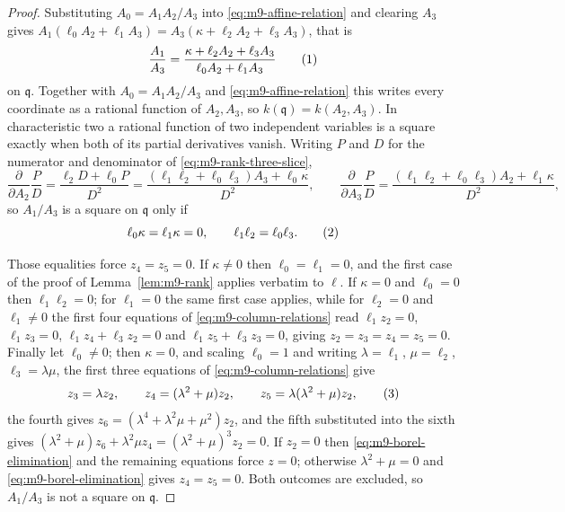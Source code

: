 \begin{proof}
Substituting $A_0=A_1A_2/A_3$ into \eqref{eq:m9-affine-relation} and clearing
$A_3$ gives $A_1(\ell_0A_2+\ell_1A_3)=A_3(\kappa+\ell_2A_2+\ell_3A_3)$, that
is
\[
 \frac{A_1}{A_3}=\frac{\kappa+\ell_2A_2+\ell_3A_3}
                      {\ell_0A_2+\ell_1A_3}
 \autoeqtag{eq:m9-rank-three-slice}
\]
on $\mathfrak q$.  Together with $A_0=A_1A_2/A_3$ and
\eqref{eq:m9-affine-relation} this writes every coordinate as a rational
function of $A_2,A_3$, so $k(\mathfrak q)=k(A_2,A_3)$.  In characteristic two
a rational function of
two independent variables is a square exactly when both of its partial
derivatives vanish.  Writing $P$ and $D$ for the numerator and denominator of
\eqref{eq:m9-rank-three-slice},
\[
 \frac{\partial}{\partial A_2}\frac PD=\frac{\ell_2D+\ell_0P}{D^2}
 =\frac{(\ell_1\ell_2+\ell_0\ell_3)A_3+\ell_0\kappa}{D^2},
 \qquad
 \frac{\partial}{\partial A_3}\frac PD
 =\frac{(\ell_1\ell_2+\ell_0\ell_3)A_2+\ell_1\kappa}{D^2},
\]
so $A_1/A_3$ is a square on $\mathfrak q$ only if
\[
 \ell_0\kappa=\ell_1\kappa=0,\qquad \ell_1\ell_2=\ell_0\ell_3 .
 \autoeqtag{eq:m9-square-obstruction}
\]

Those equalities force $z_4=z_5=0$.  If $\kappa\neq0$ then
$\ell_0=\ell_1=0$, and the first case of the proof of
Lemma~\ref{lem:m9-rank} applies verbatim to $\ell$.  If $\kappa=0$ and
$\ell_0=0$ then $\ell_1\ell_2=0$; for $\ell_1=0$ the same first case applies,
while for $\ell_2=0$ and $\ell_1\neq0$ the first four equations of
\eqref{eq:m9-column-relations} read $\ell_1z_2=0$, $\ell_1z_3=0$,
$\ell_1z_4+\ell_3z_2=0$ and $\ell_1z_5+\ell_3z_3=0$, giving
$z_2=z_3=z_4=z_5=0$.  Finally let $\ell_0\neq0$; then $\kappa=0$, and scaling
$\ell_0=1$ and writing $\lambda=\ell_1$, $\mu=\ell_2$, $\ell_3=\lambda\mu$,
the first three equations of \eqref{eq:m9-column-relations} give
\[
 z_3=\lambda z_2,\qquad z_4=(\lambda^2+\mu)z_2,\qquad
 z_5=\lambda(\lambda^2+\mu)z_2,
 \autoeqtag{eq:m9-borel-elimination}
\]
the fourth gives $z_6=(\lambda^4+\lambda^2\mu+\mu^2)z_2$, and the fifth
substituted into the sixth gives
$(\lambda^2+\mu)z_6+\lambda^2\mu z_4=(\lambda^2+\mu)^3z_2=0$.  If $z_2=0$
then \eqref{eq:m9-borel-elimination} and the remaining equations force $z=0$;
otherwise $\lambda^2+\mu=0$ and \eqref{eq:m9-borel-elimination} gives
$z_4=z_5=0$.
Both outcomes are excluded, so $A_1/A_3$ is not a square on $\mathfrak q$.


\end{proof}
